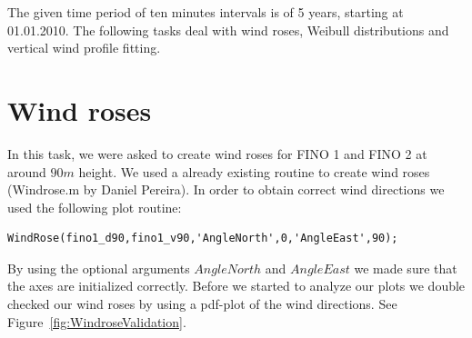 \documentclass[10pt]{article}
\begin{document}
The given time period of ten minutes intervals is of 5 years, starting at 01.01.2010. The following tasks deal with wind roses, Weibull distributions and vertical wind profile fitting.
\newpage
\section{Wind roses}
In this task, we were asked to create wind roses for FINO 1 and FINO 2 at around $90m$ height. We
used a already existing routine to create wind roses (Windrose.m by Daniel Pereira).
In order to obtain correct wind directions we used the following plot routine:\\
\begin{lstlisting}
WindRose(fino1_d90,fino1_v90,'AngleNorth',0,'AngleEast',90);
\end{lstlisting}
By using the optional arguments $AngleNorth$ and $AngleEast$ we made sure that the axes are initialized correctly.
Before we started to analyze our plots we double checked our wind roses by using a pdf-plot of the wind directions. See Figure~\ref{fig:WindroseValidation}.
\end{document}
